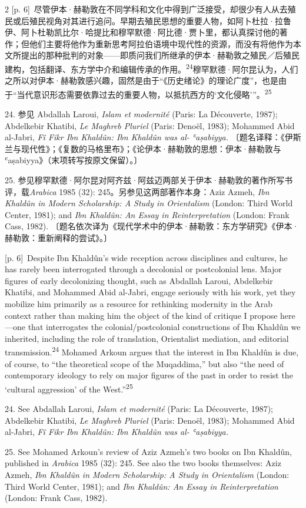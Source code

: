 \documentclass[10pt,a4paper]{article}
\begin{document}
\begin{paracol}{2}
{\scriptsize\color{gray} [p. 6]}\ 尽管伊本·赫勒敦在不同学科和文化中得到广泛接受，却很少有人从去殖民或后殖民视角对其进行追问。早期去殖民思想的重要人物，如阿卜杜拉·拉鲁伊、阿卜杜勒凯比尔·哈提比和穆罕默德·阿比德·贾卜里，都认真探讨他的著作；但他们主要将他作为重新思考阿拉伯语境中现代性的资源，而没有将他作为本文所提出的那种批判的对象——即质问我们所继承的伊本·赫勒敦之殖民／后殖民建构，包括翻译、东方学中介和编辑传承的作\mbox{用。\textsuperscript{24}}穆罕默德·阿尔昆认为，人们之所以对伊本·赫勒敦感兴趣，固然是由于“《历史绪论》的理论广度”，也是由于“当代意识形态需要依靠过去的重要人物，以抵抗西方的‘文化侵略’”。\nobreak\textsuperscript{25}\par{\small 24. 参见 Abdallah Laroui, \textit{Islam et modernité} (Paris: La Découverte, 1987); Abdelkebir Khatibi, \textit{Le Maghreb Pluriel} (Paris: Denoël, 1983); Mohammed Abid al-Jabri, \textit{Fî Fikr Ibn Khaldûn: Ibn Khaldûn was al- ʿaṣabiyya.} 〔题名译释：《伊斯兰与现代性》；《复数的马格里布》；《论伊本·赫勒敦的思想：伊本·赫勒敦与ʿaṣabiyya》（末项转写按原文保留）。〕\par}{\small 25. 参见穆罕默德·阿尔昆对阿齐兹·阿兹迈两部关于伊本·赫勒敦的著作所写书评，载\textit{Arabica} 1985 (32): 245。另参见这两部著作本身：Aziz Azmeh, \textit{Ibn Khaldûn in Modern Scholarship: A Study in Orientalism} (London: Third World Center, 1981); and \textit{Ibn Khaldûn: An Essay in Reinterpretation} (London: Frank Cass, 1982). 〔题名依次译为《现代学术中的伊本·赫勒敦：东方学研究》《伊本·赫勒敦：重新阐释的尝试》。〕\par}
\switchcolumn
{\scriptsize\color{gray} [p. 6]}\ Despite Ibn Khaldûn’s wide reception across disciplines and cultures, he has rarely been interrogated through a decolonial or postcolonial lens. Major figures of early decolonizing thought, such as Abdallah Laroui, Abdelkebir Khatibi, and Mohammed Abid al-Jabri, engage seriously with his work, yet they mobilize him primarily as a resource for rethinking modernity in the Arab context rather than making him the object of the kind of critique I propose here—one that interrogates the colonial/postcolonial constructions of Ibn Khaldûn we inherited, including the role of translation, Orientalist mediation, and editorial transmission.\nobreak\textsuperscript{24} Mohamed Arkoun argues that the interest in Ibn Khaldûn is due, of course, to “the theoretical scope of the Muqaddima,” but also “the need of contemporary ideology to rely on major figures of the past in order to resist the ‘cultural aggression’ of the West.”\nobreak\textsuperscript{25}\par{\small 24. See Abdallah Laroui, \textit{Islam et modernité} (Paris: La Découverte, 1987); Abdelkebir Khatibi, \textit{Le Maghreb Pluriel} (Paris: Denoël, 1983); Mohammed Abid al-Jabri, \textit{Fî Fikr Ibn Khaldûn: Ibn Khaldûn was al- ʿaṣabiyya.}\par}{\small 25. See Mohamed Arkoun’s review of Aziz Azmeh’s two books on Ibn Khaldûn, published in \textit{Arabica} 1985 (32): 245. See also the two books themselves: Aziz Azmeh, \textit{Ibn Khaldûn in Modern Scholarship: A Study in Orientalism} (London: Third World Center, 1981); and \textit{Ibn Khaldûn: An Essay in Reinterpretation} (London: Frank Cass, 1982).\par}

\end{paracol}
\end{document}
